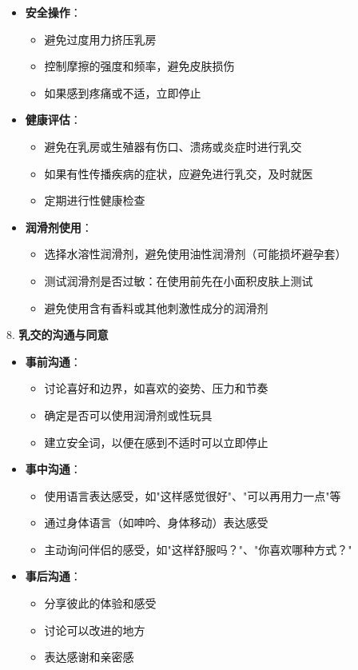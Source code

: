 \documentclass[12pt,UTF8]{ctexbook}
\begin{document}
\begin{itemize}
\begin{itemize}
		\item \textbf{安全操作}：
		\begin{itemize}
			\item 避免过度用力挤压乳房
			\item 控制摩擦的强度和频率，避免皮肤损伤
			\item 如果感到疼痛或不适，立即停止
		\end{itemize}
		\item \textbf{健康评估}：
		\begin{itemize}
			\item 避免在乳房或生殖器有伤口、溃疡或炎症时进行乳交
			\item 如果有性传播疾病的症状，应避免进行乳交，及时就医
			\item 定期进行性健康检查
		\end{itemize}
		\item \textbf{润滑剂使用}：
		\begin{itemize}
			\item 选择水溶性润滑剂，避免使用油性润滑剂（可能损坏避孕套）
			\item 测试润滑剂是否过敏：在使用前先在小面积皮肤上测试
			\item 避免使用含有香料或其他刺激性成分的润滑剂
		\end{itemize}
	\end{itemize}
\end{itemize}

8. \textbf{乳交的沟通与同意}
\begin{itemize}
	\item \textbf{事前沟通}：
	\begin{itemize}
		\item 讨论喜好和边界，如喜欢的姿势、压力和节奏
		\item 确定是否可以使用润滑剂或性玩具
		\item 建立安全词，以便在感到不适时可以立即停止
	\end{itemize}
	\item \textbf{事中沟通}：
	\begin{itemize}
		\item 使用语言表达感受，如"这样感觉很好"、"可以再用力一点"等
		\item 通过身体语言（如呻吟、身体移动）表达感受
		\item 主动询问伴侣的感受，如"这样舒服吗？"、"你喜欢哪种方式？"
	\end{itemize}
	\item \textbf{事后沟通}：
	\begin{itemize}
		\item 分享彼此的体验和感受
		\item 讨论可以改进的地方
		\item 表达感谢和亲密感
	\end{itemize}
\end{itemize}
\end{document}
